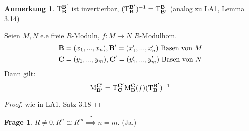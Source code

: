 \documentclass[a4paper, titlepage]{article}
\theoremstyle{definition}
\newtheorem*{anm}{Anmerkung}
\newtheorem*{frage}{Frage}
\newcommand{\B}{\text{\textbf{B}}}
\newcommand{\CB}{\text{\textbf{C}}}
\newcommand{\T}[2][1]{\mathrm{T}_{#2}^{#1}}
\newcommand{\MS}[2][1]{\mathrm{M}_{#2}^{#1}}
\begin{document}
        \begin{anm}
            $\T[\B']{\B}$ ist invertierbar, $(\T[\B']{\B})^{-1}=\T[\B]{\B'}$ (analog zu LA1, Lemma 3.14)
        \end{anm}
        \begin{satz}[Basiswechselsatz]
            Seien $M,N$ e.e freie $R$-Moduln, $f:M\longrightarrow N $ $R$-Modulhom.
            \begin{align*}
                \B&=(x_1,...,x_n), \B'=(x_1',...,x_n') \text{ Basen von }M\\
                \CB&=(y_1,...,y_m), \CB'=(y_1',...,y_m') \text{ Basen von } N
            \end{align*}
            Dann gilt:
            $$\MS[\CB']{\B'}=\T[\CB']{\CB}\MS[\CB]{\B}(f)(\T[\B']{\B})^{-1}$$
        \end{satz}
        \begin{proof}
            wie in LA1, Satz 3.18
        \end{proof}
        \begin{frage}
            $R\neq 0, R^n \cong R^m \overset{\text{?}}{\implies} n=m.$ (Ja.)
        \end{frage}
        
\end{document}
